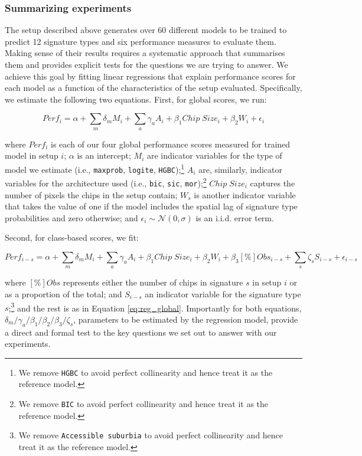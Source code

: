 \subsubsection{Summarizing experiments}


The setup described above generates over 60 different
models to be trained to predict 12 signature types and six performance measures
to evaluate them. Making sense of their results requires a
systematic approach that summarises them and provides explicit tests for the
questions we are trying to answer. We achieve this goal by fitting linear
regressions that explain performance scores for each model as a function
of the characteristics of the setup evaluated. Specifically, we estimate the
following two equations. First, for global scores, we run:

\begin{equation}
        Perf_i = \alpha +
        \sum_m \delta_m M_i +
        \sum_a \gamma_a A_i +
        \beta_1 Chip \; Size_i +
        \beta_2 W_i +
        \epsilon_i
        \label{eq:reg_global}
\end{equation}


where $Perf_i$ is each of our four global performance scores measured for trained
model in setup $i$; $\alpha$ is an intercept; $M_i$ are indicator variables for the
type of model we estimate (i.e., \texttt{maxprob}, \texttt{logite},
\texttt{HGBC});\footnote{We remove \texttt{HGBC} to avoid perfect
collinearity and hence treat it as the reference model.} $A_i$ are,
similarly, indicator variables for the architecture used (i.e.,
\texttt{bic}, \texttt{sic}, \texttt{mor});\footnote{We remove \texttt{BIC} to avoid perfect
collinearity and hence treat it as the reference model.} $Chip \; Size_i$
captures the number of pixels the chips in the setup contain; $W_s$ is another
indicator variable that takes the value of one if the model includes the
spatial lag of signature type probabilities and zero otherwise;
and $\epsilon_i \sim \mathcal{N}(0, \sigma)$ is an i.i.d. error term.

Second, for class-based scores, we fit:

\begin{equation}
        Perf_{i-s} = \alpha +
        \sum_m \delta_m M_i +
        \sum_a \gamma_a A_i +
        \beta_1 Chip \; Size_i +
        \beta_2 W_i +
        \beta_3 \left[\%\right]Obs_{i-s} +
        \sum_s \zeta_s S_{i-s} +
        \epsilon_{i-s}
        \label{eq:reg_class}
\end{equation}

where $\left[\%\right]Obs$ represents either the number of chips in
signature $s$ in setup $i$ or as a proportion of the total; and $S_{i-s}$ an
indicator variable for the signature type $s$;\footnote{We remove
\texttt{Accessible suburbia} to avoid perfect collinearity and hence treat it
as the reference model.} and the rest is as in Equation \ref{eq:reg_global}.
%
Importantly for both equations,
$\delta_m/\gamma_a/\beta_1/\beta_2/\beta_3/\zeta_s$, parameters to be
estimated by the regression model, provide a direct and formal test to the key
questions we set out to answer with our experiments.


